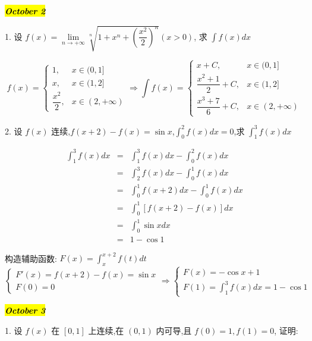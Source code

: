\hl{\textbf{\textit{October 2}}}

1. 设 $f(x)=\lim\limits_{n\to+\infty}\sqrt[n]{1+x^n+\left( \dfrac{x^2}{2}\right) ^n}(x>0)$, 求 $\int f(x)dx$
\begin{solution}
 
	$$f(x)=
	\begin{cases}
		1, &x\in(0,1]\\
		x, &x\in(1,2]\\
		\dfrac{x^2}{2}, &x\in(2,+\infty)  
	\end{cases}
	\Rightarrow 
	\int f(x)=
	\begin{cases}
		x+C, &x\in(0,1] \\
		\dfrac{x^2+1}{2}+C, &x\in(1,2] \\
		\dfrac{x^3+7}{6}+C, &x\in(2,+\infty)
	\end{cases}$$
\end{solution}

2. 设 $f(x)$ 连续,$f(x+2)-f(x)=\sin x$,$\displaystyle{\int_{0}^{2}f(x)dx=0}$,求 $\displaystyle{\int_{1}^{3}f(x)dx}$
\begin{solution}

	\begin{eqnarray*}
		\int_{1}^{3}f(x)dx
		& = & \int_{1}^{3}f(x)dx-\int_{0}^{2}f(x)dx \\
		& = & \int_{2}^{3}f(x)dx-\int_{0}^{1}f(x)dx \\
		& = & \int_{0}^{1}f(x+2)dx-\int_{0}^{1}f(x)dx \\
		& = & \int_{0}^{1}[f(x+2)-f(x)]dx \\
		& = & \int_{0}^{1}\sin xdx \\
		& = & 1-\cos 1
	\end{eqnarray*}
\end{solution}
\begin{anymark}[注]
	构造辅助函数: $\displaystyle{F(x)=\int_{x}^{x+2}f(t)dt}$  
	$$\begin{cases}
		F'(x) = f(x+2)-f(x) = \sin x\\
		F(0)  = 0
	\end{cases}\Rightarrow
	\begin{cases}
		F(x) = -\cos x+1 \\
		\displaystyle {F(1) = \int_{1}^{3}f(x)dx=1-\cos 1}
	\end{cases}$$
	\end{anymark}

\hl{\textbf{\textit{October 3}}}

1. 设 $f(x)$ 在 $[0,1]$ 上连续,在 $(0,1)$ 内可导,且 $f(0)=1,f(1)=0$, 证明:

